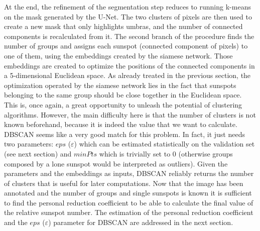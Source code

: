 \bigbreak
\noindent At the end, the refinement of the segmentation step reduces to running k-means on the mask generated by the U-Net. The two clusters of pixels are then used to create a new mask that only highlights umbras, and the number of connected components is recalculated from it.
\bigbreak
\noindent The second branch of the procedure finds the number of groups and assigns each sunspot (connected component of pixels) to one of them, using the embeddings created by the siamese network. Those embeddings are created to optimize the positions of the connected components in a 5-dimensional Euclidean space. As already treated in the previous section, the optimization operated by the siamese network lies in the fact that sunspots belonging to the same group should be close together in the Euclidean space. This is, once again, a great opportunity to unleash the potential of clustering algorithms. However, the main difficulty here is that the number of clusters is not known beforehand, because it is indeed the value that we want to calculate.
\bigbreak
\noindent DBSCAN seems like a very good match for this problem. In fact, it just needs two parameters: $eps$ ($\varepsilon$) which can be estimated statistically on the validation set (see next section) and $minPts$ which is trivially set to 0 (otherwise groups composed by a lone sunspot would be interpreted as outliers). Given the parameters and the embeddings as inputs, DBSCAN reliably returns the number of clusters that is useful for later computations.
\bigbreak
\noindent Now that the image has been annotated and the number of groups and single sunspots is known it is sufficient to find the personal reduction coefficient to be able to calculate the final value of the relative sunspot number. The estimation of the personal reduction coefficient and the $eps$ ($\varepsilon$) parameter for DBSCAN are addressed in the next section.

